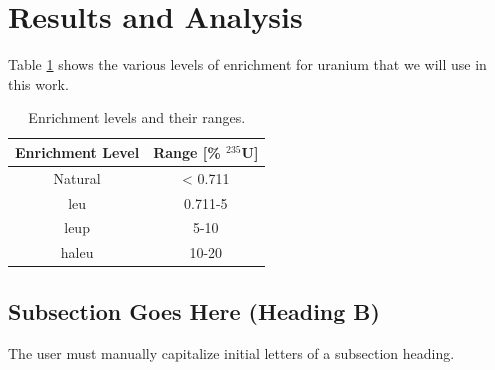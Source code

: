 \documentclass{anstrans}
\renewcommand{\vec}[1]{\bm{#1}} %
\newcommand{\vd}{\bm{\cdot}} %
\newcommand{\grad}{\vec{\nabla}} %
\newcommand{\ud}{\mathop{}\!\mathrm{d}} %
\begin{document}

\section{Results and Analysis}
Table \ref{tab:enrichment_levels} shows the various levels of enrichment for uranium that we will use in this work.

\begin{table}[!htbp]
   \centering
   \caption{Enrichment levels and their ranges.}
   \label{tab:enrichment_levels}
   \begin{tabular}{c c}
      \hline
      \textbf{Enrichment Level} & \textbf{Range [\%  $^{235}$U]} \\
      \hline
      Natural & < 0.711 \\
      \gls{leu} & 0.711-5 \\
      \gls{leup} & 5-10 \\
      \gls{haleu} & 10-20 \\
      \hline
   \end{tabular}
\end{table}

\subsection{Subsection Goes Here (Heading B)}
The user must manually capitalize initial letters of a subsection heading.
\end{document}
